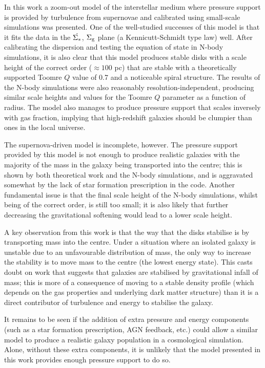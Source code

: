 In this work a zoom-out model of the interstellar medium where pressure support is provided by turbulence from supernovae and calibrated using small-scale simulations \citep{martizzi_supernova_2015} was presented.
One of the well-studied successes of this model is that it fits the data in the $\dot{\Sigma_*}$, $\Sigma_\mathrm{g}$ plane (a Kennicutt-Schmidt type law) well.
After calibrating the dispersion and testing the equation of state in N-body simulations, it is also clear that this model produces stable disks with a scale height of the correct order ($\approx 100$ pc) that are stable with a theoretically supported Toomre $Q$ value of 0.7 and a noticeable spiral structure.
The results of the N-body simulations were also reasonably resolution-independent, producing similar scale heights and values for the Toomre $Q$ parameter as a function of radius.
The model also manages to produce pressure support that scales inversely with gas fraction, implying that high-redshift galaxies should be clumpier than ones in the local universe.

The supernova-driven model is incomplete, however.
The pressure support provided by this model is not enough to produce realistic galaxies with the majority of the mass in the galaxy being transported into the centre; this is shown by both theoretical work and the N-body simulations, and is aggravated somewhat by the lack of star formation prescription in the code.
Another fundamental issue is that the final scale height of the N-body simulations, whilst being of the correct order, is still too small; it is also likely that further decreasing the gravitational softening would lead to a lower scale height.

A key observation from this work is that the way that the disks stabilise is by transporting mass into the centre.
Under a situation where an isolated galaxy is unstable due to an unfavourable distribution of mass, the only way to increase the stability is to move mass to the centre (the lowest energy state).
This casts doubt on work that suggests that galaxies are stabilised by gravitational infall of mass; this is more of a consequence of moving to a stable density profile (which depends on the gas properties and underlying dark matter structure) than it is a direct contributor of turbulence and energy to stabilise the galaxy.

It remains to be seen if the addition of extra pressure and energy components (such as a star formation prescription, AGN feedback, etc.) could allow a similar model to produce a realistic galaxy population in a cosmological simulation.
Alone, without these extra components, it is unlikely that the model presented in this work provides enough pressure support to do so.
